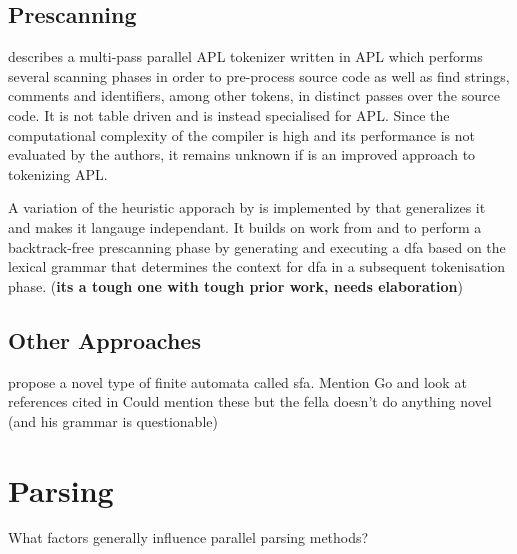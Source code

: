 \subsection{Prescanning} \label{lit_prescanning}

\cite{bernecky_spmdsimd_2003} describes a multi-pass parallel APL tokenizer
written in APL which performs several scanning phases in order to pre-process
source code as well as find strings, comments and identifiers, among other
tokens, in distinct passes over the source code. It is not table driven and is
instead specialised for APL. Since the computational complexity of the compiler
is high and its performance is not evaluated by the authors, it remains unknown
if is an improved approach to tokenizing APL.

A variation of the heuristic apporach by \cite{barenghi_parallel_2015} is
implemented by \cite{li_plex_2021} that generalizes it and makes it langauge
independant. It builds on work from \cite{sinya_simultaneous_2013} and
\cite{zhao_--fly_2015} to perform a backtrack-free prescanning phase by
generating and executing a \gls{dfa} based on the lexical grammar that determines
the context for \gls{dfa} in a subsequent tokenisation phase. (\textbf{its a
tough one with tough prior work, needs elaboration})


\subsection{Other Approaches}

\begin{roughwork}
\cite{sinya_simultaneous_2013} propose a novel type of finite automata called
\gls{sfa}.
\newline \newline
Mention \cite{lin_accelerating_2013, wang_hyperscan_2019,
li_plex_2021, asthagiri_associative_1992} Go and look at references cited in
\cite{zhao_--fly_2015}
\newline \newline
Could mention these but the fella doesn't do anything novel (and his
grammar is questionable) \cite{barve_parallel_2014, barve_parallel_2012,
barve_improved_2015}
\end{roughwork}

\section{Parsing} \label{lit_review_parsing}
\begin{sectionplan}
    What factors generally influence parallel parsing methods?
\end{sectionplan}



